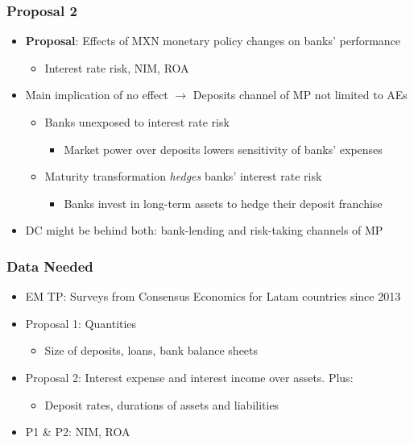 \documentclass[12pt, aspectratio=169, xcolor=dvipsnames]{beamer} 			         %
\begin{document}
\begin{frame}
	\frametitle{Proposal 2}
	\begin{itemize}
		\item \textbf{Proposal}: Effects of MXN monetary policy changes on banks' performance
		\begin{itemize}
			\item Interest rate risk, NIM, ROA
		\end{itemize}
		\item Main implication of no effect $\rightarrow$ Deposits channel of MP not limited to AEs
		\begin{itemize}
			\item Banks unexposed to interest rate risk
			\begin{itemize}
				\item Market power over deposits lowers sensitivity of banks' expenses
			\end{itemize}
			\item Maturity transformation \textit{hedges} banks' interest rate risk
			\begin{itemize}
				\item Banks invest in long-term assets to hedge their deposit franchise
			\end{itemize}
		\end{itemize}
		\item DC might be behind both: bank-lending and risk-taking channels of MP
	\end{itemize}
\end{frame}

\begin{frame}
	\frametitle{Data Needed}
	\begin{itemize}
		\item EM TP: Surveys from Consensus Economics for Latam countries since 2013
		\item Proposal 1: Quantities
		\begin{itemize}
			\item Size of deposits, loans, bank balance sheets
		\end{itemize}
		\item Proposal 2: Interest expense and interest income over assets. Plus:
		\begin{itemize}
			\item Deposit rates, durations of assets and liabilities
		\end{itemize}
		\item P1 \& P2: NIM, ROA
	\end{itemize}
\end{frame}
\end{document}
